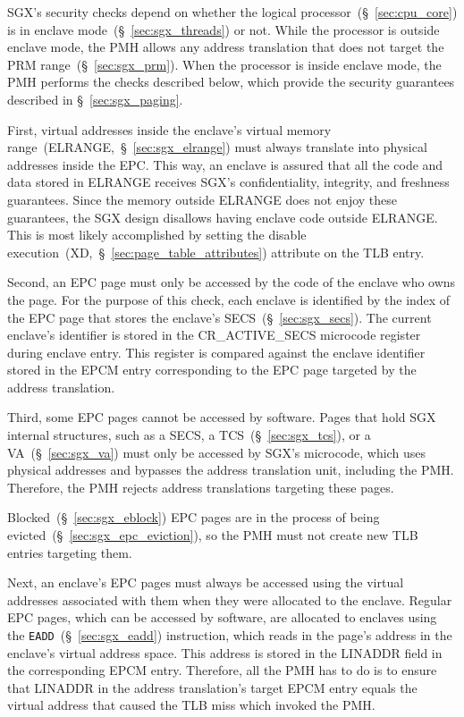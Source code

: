 SGX's security checks depend on whether the logical
processor~(\S~\ref{sec:cpu_core}) is in enclave mode~(\S~\ref{sec:sgx_threads})
or not. While the processor is outside enclave mode, the PMH allows any address
translation that does not target the PRM range~(\S~\ref{sec:sgx_prm}). When the
processor is inside enclave mode, the PMH performs the checks described below,
which provide the security guarantees described in \S~\ref{sec:sgx_paging}.

First, virtual addresses inside the enclave's virtual memory
range~(ELRANGE,~\S~\ref{sec:sgx_elrange}) must always translate into physical
addresses inside the EPC. This way, an enclave is assured that all the code and
data stored in ELRANGE receives SGX's confidentiality, integrity, and freshness
guarantees. Since the memory outside ELRANGE does not enjoy these guarantees,
the SGX design disallows having enclave code outside ELRANGE. This is most
likely accomplished by setting the disable
execution~(XD,~\S~\ref{sec:page_table_attributes}) attribute on the TLB entry.

Second, an EPC page must only be accessed by the code of the enclave who owns
the page. For the purpose of this check, each enclave is identified by the
index of the EPC page that stores the enclave's SECS~(\S~\ref{sec:sgx_secs}).
The current enclave's identifier is stored in the CR\_ACTIVE\_SECS microcode
register during enclave entry. This register is compared against the enclave
identifier stored in the EPCM entry corresponding to the EPC page targeted by
the address translation.


Third, some EPC pages cannot be accessed by software. Pages that hold SGX
internal structures, such as a SECS, a TCS~(\S~\ref{sec:sgx_tcs}), or a
VA~(\S~\ref{sec:sgx_va}) must only be accessed by SGX's microcode, which uses
physical addresses and bypasses the address translation unit, including the
PMH. Therefore, the PMH rejects address translations targeting these pages.

Blocked~(\S~\ref{sec:sgx_eblock}) EPC pages are in the process of being
evicted~(\S~\ref{sec:sgx_epc_eviction}), so the PMH must not create new TLB
entries targeting them.

Next, an enclave's EPC pages must always be accessed using the virtual
addresses associated with them when they were allocated to the enclave. Regular
EPC pages, which can be accessed by software, are allocated to enclaves using
the \texttt{EADD}~(\S~\ref{sec:sgx_eadd}) instruction, which reads in the
page's address in the enclave's virtual address space. This address is stored
in the LINADDR field in the corresponding EPCM entry. Therefore, all the PMH
has to do is to ensure that LINADDR in the address translation's target EPCM
entry equals the virtual address that caused the TLB miss which invoked the
PMH.

